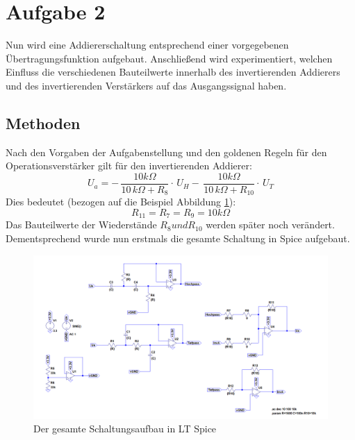 \section{Aufgabe 2}
Nun wird eine Addiererschaltung entsprechend einer vorgegebenen Übertragungsfunktion aufgebaut. Anschließend wird experimentiert, welchen Einfluss die verschiedenen Bauteilwerte innerhalb des invertierenden Addierers und des invertierenden Verstärkers auf das Ausgangssignal haben.

\subsection{Methoden}


Nach den Vorgaben der Aufgabenstellung und den goldenen Regeln für den Operationsverstärker \cite{skript} gilt für den invertierenden Addierer:
\begin{equation}
U_{a}=-\,{\frac {10k\Omega }{10\,k\Omega +R_{8}}}\cdot\,U_{H}-\,{\frac {10k
\Omega}{10\,k\Omega +R_{10}}}\cdot\,U_{T}
\end{equation}
Dies bedeutet (bezogen auf die Beispiel Abbildung \ref{spicegesamt}):
\begin{equation}
R_{11}=R_{7}=R_{9}=10\si{k\Omega}
\end{equation}
Das Bauteilwerte der Wiederstände $R_{8} und  R_{10}$ werden später noch verändert.
Dementsprechend wurde nun erstmals die gesamte Schaltung in Spice aufgebaut.\newline

\begin{figure}[h]
\includegraphics[width=14cm]{pics/SpiceSchaltungGesamt.png}
\caption{Der gesamte Schaltungsaufbau in LT Spice}
\label{spicegesamt}
\end{figure}

